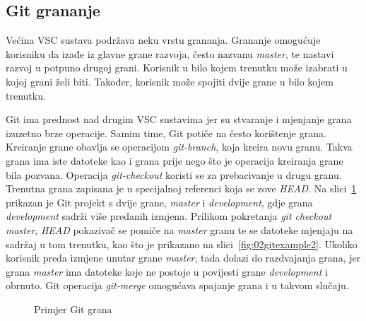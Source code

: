\subsection{Git grananje}
Većina VSC sustava podržava neku vrstu grananja. Grananje omogućuje korisniku da izađe iz glavne
grane razvoja, često nazvanu \textit{master}, te nastavi razvoj u potpuno drugoj grani. Korisnik u
bilo kojem trenutku može izabrati u kojoj grani želi biti. Također, korisnik može spojiti dvije
grane u bilo kojem trenutku.

Git ima prednost nad drugim VSC sustavima jer su stvaranje i mjenjanje grana izuzetno brze
operacije. Samim time, Git potiče na često korištenje grana. Kreiranje grane obavlja se operacijom
\textit{git-branch}, koja kreira novu granu. Takva grana ima iste datoteke kao i grana prije nego
što je operacija kreiranja grane bila pozvana. Operacija \textit{git-checkout} koristi se za
prebacivanje u drugu granu. Trenutna grana zapisana je u specijalnoj referenci koja se zove
\textit{HEAD}. Na slici~\ref{fig:02gitexample} prikazan je Git projekt s dvije grane,
\textit{master} i \textit{development}, gdje grana \textit{development} sadrži više predanih
izmjena. Prilikom pokretanja \textit{git checkout master}, \textit{HEAD} pokazivač se pomiče na
\textit{master} granu te se datoteke mjenjaju na sadržaj u tom trenutku, kao što je prikazano na
slici~\ref{fig:02gitexample2}. Ukoliko korisnik preda izmjene unutar grane \textit{master}, tada
dolazi do razdvajanja grana, jer grana \textit{master} ima datoteke koje ne postoje u povijesti
grane \textit{development} i obrnuto. Git operacija \textit{git-merge} omogućava spajanje grana i u
takvom slučaju.

\begin{figure}[h]
    \centering

    \caption{Primjer Git grana}%
    \label{fig:02gitexample}
\end{figure}

